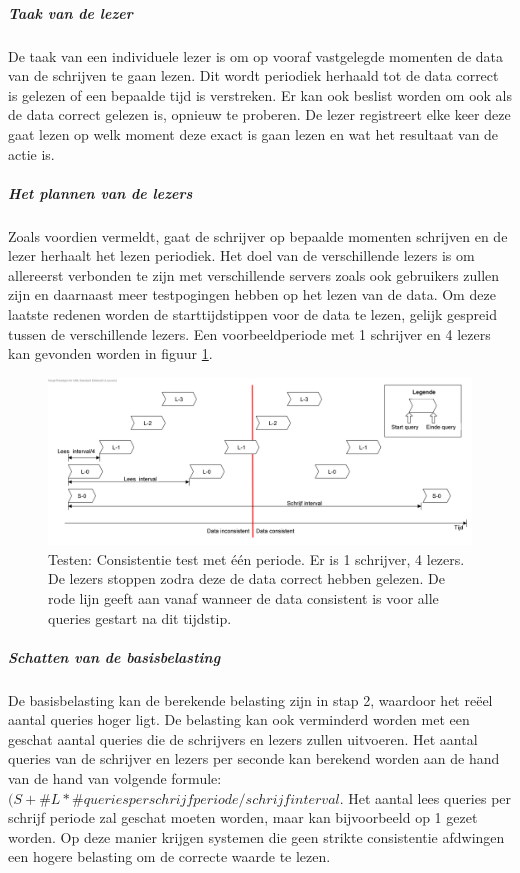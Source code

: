\subparagraph{Taak van de lezer} De taak van een individuele lezer is om op vooraf vastgelegde momenten de data van de schrijven te gaan lezen. Dit wordt periodiek herhaald tot de data correct is gelezen of een bepaalde tijd is verstreken. Er kan ook beslist worden om ook als de data correct gelezen is, opnieuw te proberen. De lezer registreert elke keer deze gaat lezen op welk moment deze exact is gaan lezen en wat het resultaat van de actie is.  

\subparagraph{Het plannen van de lezers} Zoals voordien vermeldt, gaat de schrijver op bepaalde momenten schrijven en de lezer herhaalt het lezen periodiek. Het doel van de verschillende lezers is om allereerst verbonden te zijn met verschillende servers zoals ook gebruikers zullen zijn en daarnaast meer testpogingen hebben op het lezen van de data. Om deze laatste redenen worden de starttijdstippen voor de data te lezen, gelijk gespreid tussen de verschillende lezers. Een voorbeeldperiode met 1 schrijver en 4 lezers kan gevonden worden in figuur \ref{fig:test-consistentietest-periode}. 

\begin{figure}[ht!]
\centering
\includegraphics[width=\linewidth]{img/Consistentie-test-periode}
\caption{Testen: Consistentie test met één periode. Er is 1 schrijver, 4 lezers. De lezers stoppen zodra deze de data correct hebben gelezen. De rode lijn geeft aan vanaf wanneer de data consistent is voor alle queries gestart na dit tijdstip. }
\label{fig:test-consistentietest-periode}
\end{figure}


\subparagraph{Schatten van de basisbelasting} De basisbelasting kan de berekende belasting zijn in stap 2, waardoor het reëel aantal queries hoger ligt. De belasting kan ook verminderd worden met een geschat aantal queries die de schrijvers en lezers zullen uitvoeren. Het aantal queries van de schrijver en lezers per seconde kan berekend worden aan de hand van de hand van volgende formule: $(S + \#L*\#queriesperschrijfperiode / schrijfinterval$. Het aantal lees queries per schrijf periode zal geschat moeten worden, maar kan bijvoorbeeld op 1 gezet worden. Op deze manier krijgen systemen die geen strikte consistentie afdwingen een hogere belasting om de correcte waarde te lezen. 

